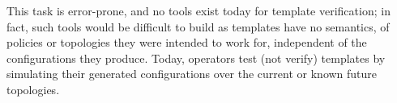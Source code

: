 \documentclass{sig-alternate-10pt}
\newcommand{\IE}{\emph{i.e.}}
\begin{document}
This task is error-prone, and no tools exist today for template verification; in fact, such tools would be difficult to build as templates have no semantics, of policies or topologies they were intended to work for, independent of the configurations they produce. Today, operators test (not verify) templates by simulating their generated configurations over the current or known future topologies.



\end{document}
